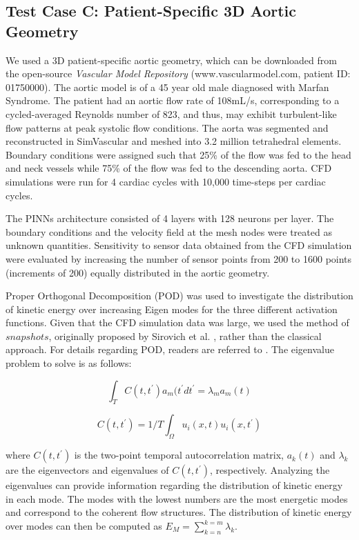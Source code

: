\documentclass[times,twocolumn,final]{elsarticle}
\begin{document}
{%
\subsection{Test Case C: Patient-Specific 3D Aortic Geometry}
We used a 3D patient-specific aortic geometry, which can be downloaded from the open-source \textit{Vascular Model Repository} (www.vascularmodel.com, patient ID: 01750000). The aortic model is of a 45 year old male diagnosed with Marfan Syndrome. The patient had an aortic flow rate of 108mL/s, corresponding to a cycled-averaged Reynolds number of 823, and thus, may exhibit turbulent-like flow patterns at peak systolic flow conditions. The aorta was segmented and reconstructed in SimVascular and meshed into 3.2 million tetrahedral elements. Boundary conditions were assigned such that 25\% of the flow was fed to the head and neck vessels while 75\% of the flow was fed to the descending aorta. CFD simulations were run for 4 cardiac cycles with 10,000 time-steps per cardiac cycles. 

The PINNs architecture consisted of 4 layers with 128 neurons per layer. The boundary conditions and the velocity field at the mesh nodes were treated as unknown quantities. Sensitivity to sensor data obtained from the CFD simulation were evaluated by increasing the number of sensor points from 200 to 1600 points (increments of 200) equally distributed in the aortic geometry. 

Proper Orthogonal Decomposition (POD) was used to investigate the distribution of kinetic energy over increasing Eigen modes for the three different activation functions. Given that the CFD simulation data was large, we used the method of $snapshots$, originally proposed by Sirovich et al. \citep{Sirovich1987_POD}, rather than the classical approach. For details regarding POD, readers are referred to \citep{Nobach2007_POD}. The eigenvalue problem to solve is as follows:

\begin{equation}
\int_{T}C(t,t^{'})a_{m}(t^{'}dt^{'}=\lambda_{m}a_{m}(t) 
\end{equation}

\begin{equation}
C(t,t^{'})=1/T\int_{\Omega}u_{i}(x,t)u_{i}(x,t^{'})
\end{equation}

where $C(t,t^{'})$ is the two-point temporal autocorrelation matrix, $a_{k}(t)$ and $\lambda_{k}$ are the eigenvectors and eigenvalues of $C(t,t^{'})$, respectively. Analyzing the eigenvalues can provide information regarding the distribution of kinetic energy in each mode. The modes with the lowest numbers are the most energetic modes and correspond to the coherent flow structures. The distribution of kinetic energy over modes can then be computed as $E_{M}=  \sum_{k=n}^{k=m} \lambda_{k}$.

}
\end{document}
